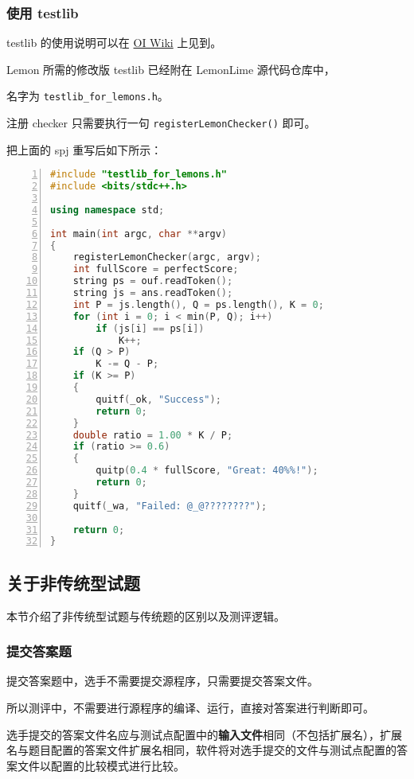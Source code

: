 \documentclass[UTF-8]{ctexart}
\begin{document}
    \subsubsection{使用 testlib}

    testlib 的使用说明可以在 \href{https://oi-wiki.org/intro/testlib/}{OI Wiki} 上见到。

    Lemon 所需的修改版 testlib 已经附在 LemonLime 源代码仓库中，

    名字为 \texttt{testlib\_for\_lemons.h}。

    注册 checker 只需要执行一句 \texttt{registerLemonChecker()} 即可。

    把上面的 spj 重写后如下所示：

    \begin{lstlisting}[language={C++},numbers=left,showspaces=false,showstringspaces=false,frame=shadowbox,basicstyle=\ttfamily]
#include "testlib_for_lemons.h"
#include <bits/stdc++.h>

using namespace std;

int main(int argc, char **argv)
{
	registerLemonChecker(argc, argv);
	int fullScore = perfectScore;
	string ps = ouf.readToken();
	string js = ans.readToken();
	int P = js.length(), Q = ps.length(), K = 0;
	for (int i = 0; i < min(P, Q); i++)
		if (js[i] == ps[i])
			K++;
	if (Q > P)
		K -= Q - P;
	if (K >= P)
	{
		quitf(_ok, "Success");
		return 0;
	}
	double ratio = 1.00 * K / P;
	if (ratio >= 0.6)
	{
		quitp(0.4 * fullScore, "Great: 40%%!");
		return 0;
	}
	quitf(_wa, "Failed: @_@????????");

	return 0;
}
    \end{lstlisting}


    \subsection{关于非传统型试题}

    本节介绍了非传统型试题与传统题的区别以及测评逻辑。

    \subsubsection{提交答案题}

    提交答案题中，选手不需要提交源程序，只需要提交答案文件。

    所以测评中，不需要进行源程序的编译、运行，直接对答案进行判断即可。

    选手提交的答案文件名应与测试点配置中的\textbf{输入文件}相同（不包括扩展名），扩展名与题目配置的答案文件扩展名相同，软件将对选手提交的文件与测试点配置的答案文件以配置的比较模式进行比较。
\end{document}
